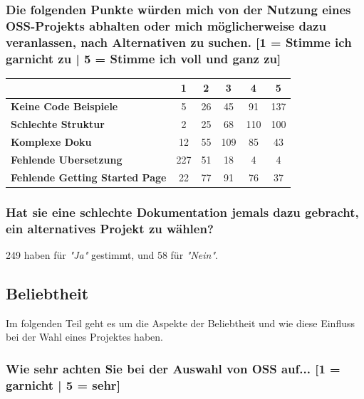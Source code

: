 \subsubsection*{Die folgenden Punkte würden mich von der Nutzung eines OSS-Projekts abhalten oder mich möglicherweise dazu veranlassen, nach
    Alternativen zu suchen. [1 = Stimme ich garnicht zu | 5 = Stimme ich voll und ganz zu]}
\begin{table}[h]
    \begin{tabular}{l|c|c|c|c|c|}
                                               & \textbf{1} & \textbf{2} & \textbf{3} & \textbf{4} & \textbf{5} \\ \hline
        \textbf{Keine Code Beispiele}          & 5          & 26         & 45         & 91         & 137        \\ \hline
        \textbf{Schlechte Struktur}            & 2          & 25         & 68         & 110        & 100        \\ \hline
        \textbf{Komplexe Doku}                 & 12         & 55         & 109        & 85         & 43         \\ \hline
        \textbf{Fehlende Ubersetzung}          & 227        & 51         & 18         & 4          & 4          \\ \hline
        \textbf{Fehlende Getting Started Page} & 22         & 77         & 91         & 76         & 37         \\ \hline
    \end{tabular}%
\end{table}

\subsubsection*{Hat sie eine schlechte Dokumentation jemals dazu gebracht, ein alternatives Projekt zu wählen?}

249 haben für \textit{"Ja"} gestimmt, und 58 für \textit{"Nein"}.

\subsection{Beliebtheit}

Im folgenden Teil geht es um die Aspekte der Beliebtheit und wie diese Einfluss bei der Wahl eines Projektes haben.

\subsubsection*{Wie sehr achten Sie bei der Auswahl von OSS auf... [1 = garnicht | 5 = sehr]}


